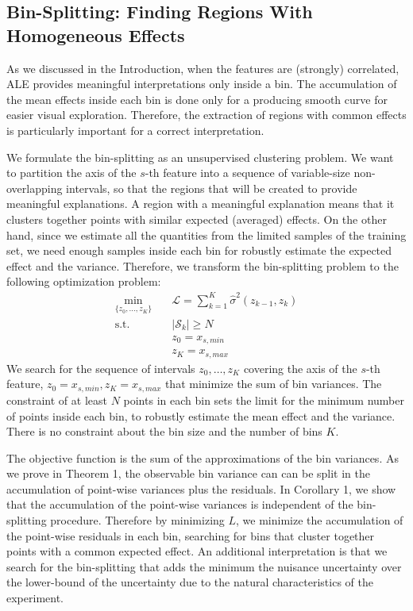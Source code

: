\documentclass[twoside]{article}
\begin{document}
\subsection{Bin-Splitting: Finding Regions With Homogeneous Effects}
\label{sec:interval-spliting}

As we discussed in the Introduction, when the features are (strongly)
correlated, ALE provides meaningful interpretations only inside a
bin. The accumulation of the mean effects inside each bin is done only
for a producing smooth curve for easier visual exploration. Therefore,
the extraction of regions with common effects is particularly
important for a correct interpretation.

We formulate the bin-splitting as an unsupervised clustering
problem. We want to partition the axis of the \(s\)-th feature into a
sequence of variable-size non-overlapping intervals, so that the
regions that will be created to provide meaningful explanations. A
region with a meaningful explanation means that it clusters together
points with similar expected (averaged) effects. On the other hand,
since we estimate all the quantities from the limited samples of the
training set, we need enough samples inside each bin for robustly
estimate the expected effect and the variance. Therefore, we transform
the bin-splitting problem to the following optimization problem:
\begin{equation}
  \label{eq:opt}
\begin{aligned}
  \min_{ \{z_0, \ldots, z_K\}} \quad & \mathcal{L} = \sum_{k=1}^K \hat{\sigma}^2(z_{k-1}, z_k) \\
  \textrm{s.t.} \quad & |\mathcal{S}_k| \geq N\\
                                     & z_0 = x_{s,min}\\
                                     & z_K = x_{s, max}
\end{aligned}
\end{equation}
%
We search for the sequence of intervals \(z_0, \ldots, z_K\) covering
the axis of the \(s\)-th feature, \(z_0 = x_{s,min}, z_K = x_{s,max}\)
that minimize the sum of bin variances. The constraint of at least
\(N\) points in each bin sets the limit for the minimum number of
points inside each bin, to robustly estimate the mean effect and the
variance. There is no constraint about the bin size and the number of
bins \(K\).

The objective function is the sum of the approximations of the bin
variances. As we prove in Theorem 1, the observable bin variance can
can be split in the accumulation of point-wise variances plus the
residuals. In Corollary 1, we show that the accumulation of the
point-wise variances is independent of the bin-splitting
procedure. Therefore by minimizing \(L\), we minimize the accumulation
of the point-wise residuals in each bin, searching for bins that
cluster together points with a common expected effect. An additional
interpretation is that we search for the bin-splitting that adds the
minimum the nuisance uncertainty over the lower-bound of the
uncertainty due to the natural characteristics of the experiment.
\end{document}
